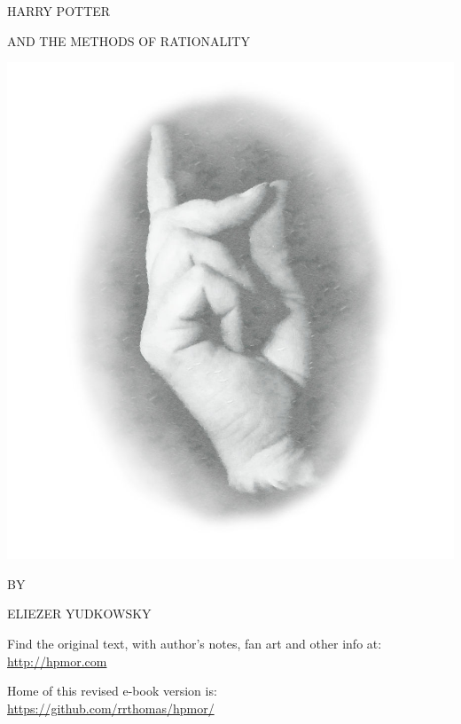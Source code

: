 \begin{center}
\thispagestyle{empty}
{\hpfont
\Huge\MakeUppercase{Harry Potter}\vspace*{0.5cm}

\Large\MakeUppercase{and the Methods of Rationality} %

\includegraphics[scale=0.5]{images/bubble0.jpg}

\Large BY \vspace*{.25cm}

\huge \MakeUppercase{Eliezer Yudkowsky}%

\normalsize

\vspace*{1\baselineskip}
\fullvolumetitle{\volumenumber}
}

\vfill
Find the original text, with author's notes, fan art and other info at:\\
\url{http://hpmor.com}

Home of this revised e-book version is:\\
\url{https://github.com/rrthomas/hpmor/}
\end{center}

\cleartoverso

